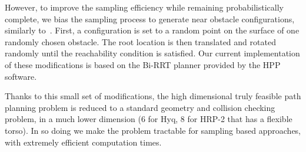 However, to improve the sampling efficiency while remaining probabilistically complete, we bias the sampling process to generate near obstacle configurations, similarly to~\cite{Amato98choosinggood}.
First, a configuration is set to a random point on the surface of one randomly chosen obstacle. The root location is then translated and rotated randomly until the reachability condition is satisfied.
Our current implementation of these modifications is based on the Bi-RRT planner provided by the HPP software.

Thanks to this small set of modifications, the high dimensional truly feasible path planning problem is reduced to a standard geometry and collision checking problem, in a much lower dimension (6 for Hyq, 8 for HRP-2 that has a flexible torso). In so doing we make the problem tractable for sampling based approaches, with extremely efficient computation times.
